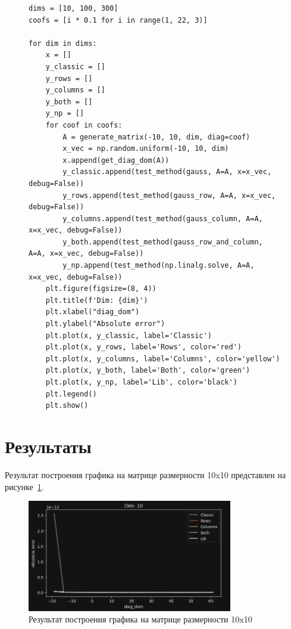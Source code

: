 \documentclass[a4paper, 14pt]{extarticle}
\begin{document}
\begin{figure}[H]
\begin{lstlisting}[language={},caption={Построение графика},label={lst:code4}]
dims = [10, 100, 300]
coofs = [i * 0.1 for i in range(1, 22, 3)]

for dim in dims:
    x = []
    y_classic = []
    y_rows = []
    y_columns = []
    y_both = []
    y_np = []
    for coof in coofs:
        A = generate_matrix(-10, 10, dim, diag=coof)
        x_vec = np.random.uniform(-10, 10, dim)
        x.append(get_diag_dom(A))
        y_classic.append(test_method(gauss, A=A, x=x_vec, debug=False))
        y_rows.append(test_method(gauss_row, A=A, x=x_vec, debug=False))
        y_columns.append(test_method(gauss_column, A=A, x=x_vec, debug=False))
        y_both.append(test_method(gauss_row_and_column, A=A, x=x_vec, debug=False))
        y_np.append(test_method(np.linalg.solve, A=A, x=x_vec, debug=False))
    plt.figure(figsize=(8, 4))
    plt.title(f'Dim: {dim}')
    plt.xlabel("diag_dom")
    plt.ylabel("Absolute error")
    plt.plot(x, y_classic, label='Classic')
    plt.plot(x, y_rows, label='Rows', color='red')
    plt.plot(x, y_columns, label='Columns', color='yellow')
    plt.plot(x, y_both, label='Both', color='green')
    plt.plot(x, y_np, label='Lib', color='black')
    plt.legend()
    plt.show()
\end{lstlisting}
\end{figure}

\section{Результаты}

Результат построения графика на матрице размерности 10x10 представлен на рисунке~\ref{fig:img1}.

\begin{figure}[H]
\centering
\includegraphics[width=0.8\textwidth]{images/res1.png}
\caption{Результат построения графика на матрице размерности 10x10}
\label{fig:img1}
\end{figure}
\end{document}
